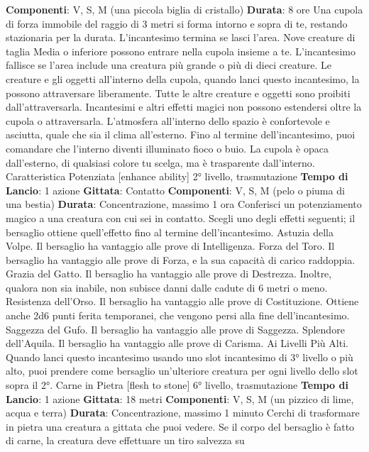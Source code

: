 \begin{multicols}{2}
\textbf{Componenti}: V, S, M (una piccola biglia di cristallo)
\textbf{Durata}: 8 ore
Una cupola di forza immobile del raggio di 3 metri si
forma intorno e sopra di te, restando stazionaria per la
durata. L’incantesimo termina se lasci l’area.
Nove creature di taglia Media o inferiore possono
entrare nella cupola insieme a te. L’incantesimo fallisce
se l’area include una creatura più grande o più di dieci
creature. Le creature e gli oggetti all’interno della
cupola, quando lanci questo incantesimo, la possono
attraversare liberamente. Tutte le altre creature e
oggetti sono proibiti dall’attraversarla. Incantesimi e altri
effetti magici non possono estendersi oltre la cupola o
attraversarla. L’atmosfera all’interno dello spazio è
confortevole e asciutta, quale che sia il clima
all’esterno.
Fino al termine dell’incantesimo, puoi comandare che
l’interno diventi illuminato fioco o buio. La cupola è
opaca dall’esterno, di qualsiasi colore tu scelga, ma è
trasparente dall’interno.
Caratteristica Potenziata
[enhance ability]
2° livello, trasmutazione
\textbf{Tempo di Lancio}: 1 azione
\textbf{Gittata}: Contatto
\textbf{Componenti}: V, S, M (pelo o piuma di una bestia)
\textbf{Durata}: Concentrazione, massimo 1 ora
Conferisci un potenziamento magico a una creatura con
cui sei in contatto. Scegli uno degli effetti seguenti; il
bersaglio ottiene quell’effetto fino al termine
dell’incantesimo.
Astuzia della Volpe. Il bersaglio ha vantaggio alle
prove di Intelligenza.
Forza del Toro. Il bersaglio ha vantaggio alle prove di
Forza, e la sua capacità di carico raddoppia.
Grazia del Gatto. Il bersaglio ha vantaggio alle prove di
Destrezza. Inoltre, qualora non sia inabile, non subisce
danni dalle cadute di 6 metri o meno.
Resistenza dell’Orso. Il bersaglio ha vantaggio alle
prove di Costituzione. Ottiene anche 2d6 punti ferita
temporanei, che vengono persi alla fine
dell’incantesimo.
Saggezza del Gufo. Il bersaglio ha vantaggio alle
prove di Saggezza.
Splendore dell’Aquila. Il bersaglio ha vantaggio alle
prove di Carisma.
Ai Livelli Più Alti. Quando lanci questo incantesimo
usando uno slot incantesimo di 3° livello o più alto, puoi
prendere come bersaglio un’ulteriore creatura per ogni
livello dello slot sopra il 2°.
Carne in Pietra
[flesh to stone]
6° livello, trasmutazione
\textbf{Tempo di Lancio}: 1 azione
\textbf{Gittata}: 18 metri
\textbf{Componenti}: V, S, M (un pizzico di lime, acqua e terra)
\textbf{Durata}: Concentrazione, massimo 1 minuto
Cerchi di trasformare in pietra una creatura a gittata che
puoi vedere. Se il corpo del bersaglio è fatto di carne, la
creatura deve effettuare un tiro salvezza su

\end{multicols}
